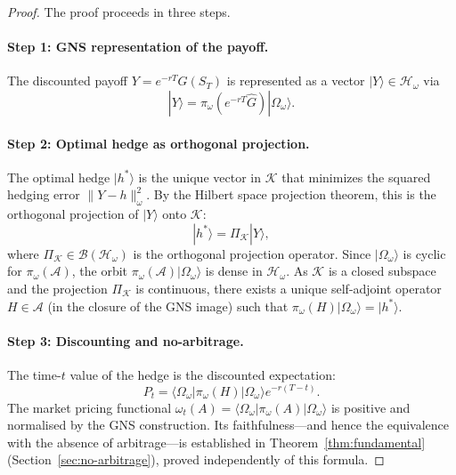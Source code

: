 \begin{proof}
The proof proceeds in three steps.

\paragraph{Step 1: GNS representation of the payoff.}
The discounted payoff $Y = e^{-rT} G(S_T)$ is represented as a vector
$|Y\rangle \in \mathcal{H}_\omega$ via
\begin{equation*}
    |Y\rangle = \pi_\omega(e^{-rT} \hat{G}) |\Omega_\omega\rangle.
\end{equation*}

\paragraph{Step 2: Optimal hedge as orthogonal projection.}
The optimal hedge $|h^*\rangle$ is the unique vector in $\mathcal{K}$ that minimizes
the squared hedging error $\|Y - h\|_\omega^2$. By the Hilbert space projection
theorem, this is the orthogonal projection of $|Y\rangle$ onto $\mathcal{K}$:
\begin{equation*}
    |h^*\rangle = \Pi_{\mathcal{K}} |Y\rangle,
\end{equation*}
where $\Pi_{\mathcal{K}} \in \mathcal{B}(\mathcal{H}_\omega)$ is the orthogonal
projection operator. Since $|\Omega_\omega\rangle$ is cyclic for $\pi_\omega(\mathcal{A})$,
the orbit $\pi_\omega(\mathcal{A})|\Omega_\omega\rangle$ is dense in
$\mathcal{H}_\omega$. As $\mathcal{K}$ is a closed subspace and the projection
$\Pi_{\mathcal{K}}$ is continuous, there exists a unique self-adjoint operator
$H \in \mathcal{A}$ (in the closure of the GNS image) such that
$\pi_\omega(H) |\Omega_\omega\rangle = |h^*\rangle$.

\paragraph{Step 3: Discounting and no-arbitrage.}
The time-$t$ value of the hedge is the discounted expectation:
\begin{equation*}
    P_t = \langle \Omega_\omega | \pi_\omega(H) | \Omega_\omega \rangle e^{-r(T-t)}.
\end{equation*}
The market pricing functional
$\omega_t(A) = \langle \Omega_\omega | \pi_\omega(A) | \Omega_\omega \rangle$ is
positive and normalised by the GNS construction. Its faithfulness---and hence the
equivalence with the absence of arbitrage---is established in
Theorem~\ref{thm:fundamental} (Section~\ref{sec:no-arbitrage}), proved
independently of this formula.
\end{proof}

